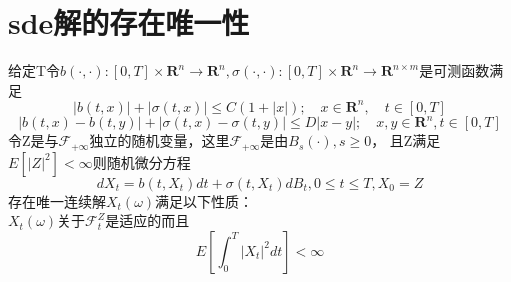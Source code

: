 \documentclass{article}%
\begin{document}
	\section{sde解的存在唯一性}给定T令$b(\cdot, \cdot):[0, T] \times \mathbf{R}^{n} \rightarrow \mathbf{R}^{n}, \sigma(\cdot, \cdot):[0, T] \times \mathbf{R}^{n} \rightarrow \mathbf{R}^{n \times m}$是可测函数满足
		\begin{equation}
		|b(t, x)|+|\sigma(t, x)| \leq C(1+|x|) ; \quad x \in \mathbf{R}^{n}, \quad t \in[0, T]
		\end{equation}
		\begin{equation}
		|b(t, x)-b(t, y)|+|\sigma(t, x)-\sigma(t, y)| \leq D|x-y| ; \quad x, y \in \mathbf{R}^{n}, t \in[0, T]
		\end{equation}
		令Z是与$\mathcal{F}_{+\infty}$独立的随机变量，这里$\mathcal{F}_{+\infty}$是由$B_s(\cdot),s\geq0$，
		且Z满足$E[|Z|^2]<\infty$则随机微分方程
		\begin{equation}
		dX_t=b(t,X_t)dt+\sigma(t,X_t)dB_t,   0\leq t\leq T,X_0=Z
		\end{equation}
		存在唯一连续解$X_t(\omega)$满足以下性质：\\
		$X_t(\omega)$关于$\mathcal{F}^Z_t$是适应的而且
		\begin{equation}
		E\left[\int_{0}^{T}\left|X_{t}\right|^{2} d t\right]<\infty
		\end{equation}
\end{document}
